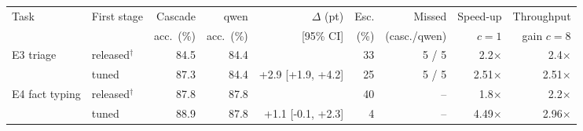 \begin{tabular}{llrrrrrrr}
\toprule
Task & First stage & Cascade & qwen & $\Delta$ (pt) & Esc. & Missed & Speed-up & Throughput \\
 & & acc.\ (\%) & acc.\ (\%) & [95\% CI] & (\%) & (casc./qwen) & $c{=}1$ & gain $c{=}8$ \\
\midrule
E3 triage & released$^\dagger$ & 84.5 & 84.4 & & 33 & 5 / 5 & 2.2$\times$ & 2.4$\times$ \\
 & tuned & 87.3 & 84.4 & +2.9 [+1.9, +4.2] & 25 & 5 / 5 & 2.51$\times$ & 2.51$\times$ \\
\midrule
E4 fact typing & released$^\dagger$ & 87.8 & 87.8 & & 40 & -- & 1.8$\times$ & 2.2$\times$ \\
 & tuned & 88.9 & 87.8 & +1.1 [-0.1, +2.3] & 4 & -- & 4.49$\times$ & 2.96$\times$ \\
\bottomrule
\end{tabular}

